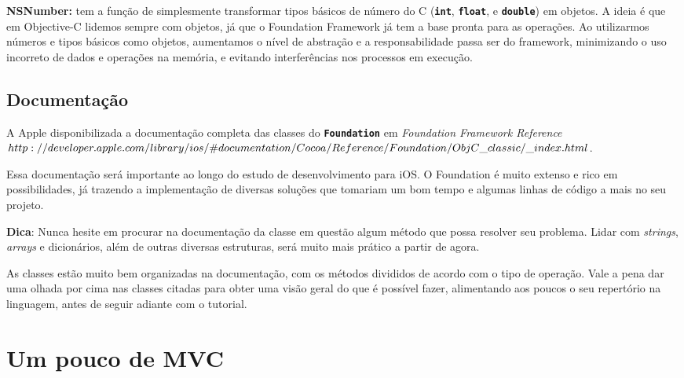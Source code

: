\documentclass[a4paper,12pt,brazil,oneside]{book}
\begin{document}
\begin{description}
\item{\textbf{NSNumber:} tem a função de simplesmente transformar tipos básicos de número do C (\texttt{\textbf{int}}, \texttt{\textbf{float}}, e \texttt{\textbf{double}}) em objetos. A ideia é que em Objective-C lidemos sempre com objetos, já que o Foundation Framework já tem a base pronta para as operações. Ao utilizarmos números e tipos básicos como objetos, aumentamos o nível de abstração e a responsabilidade passa ser do framework, minimizando o uso incorreto de dados e operações na memória, e evitando interferências nos processos em execução.}
\end{description}

\subsection{Documentação}


A Apple disponibilizada a documentação completa das classes do \texttt{\textbf{Foundation}} em
\emph{Foundation Framework Reference\\ \(http://developer.apple.com/library/ios/\#documentation/Cocoa/Reference/\\Foundation/ObjC\_classic/\_index.html\)}.

Essa documentação será importante ao longo do estudo de desenvolvimento para iOS. O Foundation é muito extenso e rico em possibilidades, já trazendo a implementação de diversas soluções que tomariam um bom tempo e algumas linhas de código a mais no seu projeto.

\begin{framed}

\textbf{Dica}: Nunca hesite em procurar na documentação da classe em questão algum método que possa resolver seu problema. Lidar com \textit{strings}, \textit{arrays} e dicionários, além de outras diversas estruturas, será muito mais prático a partir de agora.
\end{framed}


As classes estão muito bem organizadas na documentação, com os métodos divididos de acordo com o tipo de operação. Vale a pena dar uma olhada por cima nas classes citadas para obter uma visão geral do que é possível fazer, alimentando aos poucos o seu repertório na linguagem, antes de seguir adiante com o tutorial.



\section{Um pouco de MVC}
\end{document}
